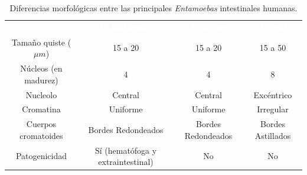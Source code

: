 \begin{table}[H]
	\begin{tabular}{c|ccc}
		\rowcolor{black}&\textcolor{white}{\textit{\textbf{E. histolytica}}}&\textcolor{white}{\textbf{\textit{E. dispar}}}&\textcolor{white}{\textit{\textbf{E. coli}}}\\
		Tamaño quiste ($\mu m$)&15 a 20&15 a 20&15 a 50\\
		\rowcolor{hiperlightgray}Núcleos (en madurez)&4&4&8\\
		Nucleolo&Central&Central&Excéntrico\\
		\rowcolor{hiperlightgray}Cromatina&Uniforme&Uniforme&Irregular\\
		Cuerpos cromatoides& Bordes Redondeados&Bordes Redondeados&Bordes Astillados\\
		\rowcolor{hiperlightgray}Patogenicidad&Sí (hematófoga y extraintestinal)&No&No\\
		\hline
	\end{tabular}
	\caption{Diferencias morfológicas entre las principales \textit{Entamoebas} intestinales humanas.\label{table:PARASIT:EHistolyticaDiferMorf}}
\end{table}
